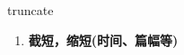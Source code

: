 
\begin{frame}
{\huge truncate}
\begin{center}
\begin{enumerate}\Large
  \item \textbf{截短，缩短(时间、篇幅等)}
\end{enumerate}
\end{center}
\end{frame}
